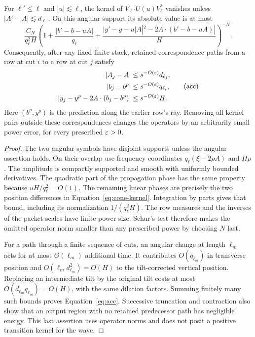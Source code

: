 \begin{lemma}\label{rt:packet-locality}
For $\ell'\le\ell$ and $|u|\lesssim\ell$, the kernel of
$V_{\ell'}U(u)V_\ell^*$ vanishes unless
$|A'-A|\lesssim d_{\ell'}$.  On this angular support its absolute value is
at most
\begin{equation}
 \frac{C_N}{q_\ell^2H}
 \left(1+\frac{|b'-b-uA|}{q_\ell}
 +\frac{|y'-y-u|A|^2-2A\cdot(b'-b-uA)|}{H}\right)^{-N}.
 \tag{cone-kernel}\label{eq:cone-kernel}
\end{equation}
Consequently, after any fixed finite stack, retained correspondence paths
from a row at cut $i$ to a row at cut $j$ satisfy
\begin{equation}
 \begin{split}
 |A_j-A|&\le s^{-O(\varepsilon)}d_{\ell_j},\\
 |b_j-b^p|&\le s^{-O(\varepsilon)}q_{\ell_i},\\
 |y_j-y^p-2A\cdot(b_j-b^p)|&\le s^{-O(\varepsilon)}H.
 \end{split}
 \tag{acc}\label{eq:acc}
\end{equation}
Here $(b^p,y^p)$ is the prediction along the earlier row's ray.  Removing
all kernel pairs outside these correspondences changes the operators by
an arbitrarily small power error, for every prescribed $\varepsilon>0$.
\end{lemma}

\begin{proof}
The two angular symbols have disjoint supports unless the angular assertion
holds.  On their overlap use frequency coordinates
$q_\ell(\xi-2\rho A)$ and $H\rho$.  The amplitude is compactly supported
and smooth with uniformly bounded derivatives.  The quadratic part of the
propagation phase has the same property because
$uH/q_\ell^2=O(1)$.  The remaining linear phases are precisely the two
position differences in Equation~\eqref{eq:cone-kernel}.  Integration by
parts gives that bound, including its normalization $1/(q_\ell^2H)$.
The row measures and the inverses of the packet scales have finite-power
size.  Schur's test therefore makes the omitted operator norm smaller than
any prescribed power by choosing $N$ last.

For a path through a finite sequence of cuts, an angular change at length
$\ell_m$ acts for at most $O(\ell_m)$ additional time.  It contributes
$O(q_{\ell_m})$ in transverse position and
$O(\ell_m d_{\ell_m}^2)=O(H)$ to the tilt-corrected vertical position.
Replacing an intermediate tilt by the original tilt costs at most
$O(d_{\ell_m}q_{\ell_m})=O(H)$, with the same dilation factors.  Summing
finitely many such bounds proves Equation~\eqref{eq:acc}.  Successive
truncation and contraction also show that an output region with no retained
predecessor path has negligible energy.  This last assertion uses operator
norms and does not posit a positive transition kernel for the wave.
\end{proof}

